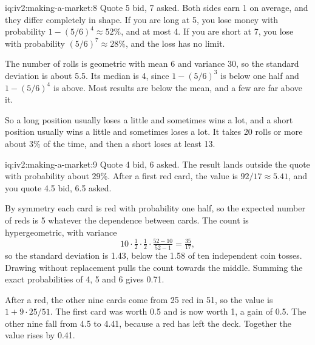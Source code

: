 \begin{solution}{iq:iv2:making-a-market:8}
Quote 5 bid, 7 asked. Both sides earn 1 on average, and they differ completely in shape. If you are long at 5, you lose money with probability $1 - (5/6)^4 \approx 52\%$, and at most 4. If you are short at 7, you lose with probability $(5/6)^7 \approx 28\%$, and the loss has no limit.

The number of rolls is geometric with mean 6 and variance 30, so the standard deviation is about 5.5. Its median is 4, since $1 - (5/6)^3$ is below one half and $1 - (5/6)^4$ is above. Most results are below the mean, and a few are far above it.

So a long position usually loses a little and sometimes wins a lot, and a short position usually wins a little and sometimes loses a lot. It takes 20 rolls or more about 3\% of the time, and then a short loses at least 13.

\end{solution}

\begin{solution}{iq:iv2:making-a-market:9}
Quote 4 bid, 6 asked. The result lands outside the quote with probability about 29\%. After a first red card, the value is $92/17 \approx 5.41$, and you quote 4.5 bid, 6.5 asked.

By symmetry each card is red with probability one half, so the expected number of reds is 5 whatever the dependence between cards. The count is hypergeometric, with variance
\[
10 \cdot \tfrac12 \cdot \tfrac12 \cdot \tfrac{52 - 10}{52 - 1} = \tfrac{35}{17},
\]
so the standard deviation is 1.43, below the 1.58 of ten independent coin tosses. Drawing without replacement pulls the count towards the middle. Summing the exact probabilities of 4, 5 and 6 gives 0.71.

After a red, the other nine cards come from 25 red in 51, so the value is $1 + 9 \cdot 25/51$. The first card was worth 0.5 and is now worth 1, a gain of 0.5. The other nine fall from 4.5 to 4.41, because a red has left the deck. Together the value rises by 0.41.

\end{solution}

